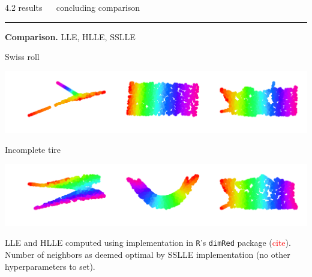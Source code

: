 \documentclass[11pt, compress, t, notes = noshow, xcolor = table, 
aspectratio = 1610]{beamer}
\begin{document}
\LARGE
\begin{frame}{\textcolor{gray!90}{4.2 results} ~~ concluding comparison}
\normalsize
\vspace{-0.5cm}
\noindent \textcolor{gray!90}{\rule{\textwidth}{1pt}}
\smallskip

\textbf{Comparison.} LLE, HLLE, SSLLE

\vspace{0.3cm}

\begin{minipage}[c]{0.2\textwidth}
  Swiss roll
\end{minipage}%
\begin{minipage}[c]{0.8\textwidth}
  \includegraphics[trim = 0 0 0 0, clip, %
    width = \textwidth]{figures/comparison_swiss}
\end{minipage}

\vspace{0.3cm}   

\begin{minipage}[c]{0.2\textwidth}
  Incomplete tire
\end{minipage}%
\begin{minipage}[c]{0.8\textwidth}
  \includegraphics[trim = 0 0 0 0, clip, %
    width = \textwidth]{figures/comparison_tire}
\end{minipage}


\vspace{0.3cm}  

\scriptsize
LLE and HLLE computed using implementation in \texttt{R}'s \texttt{dimRed} 
package (\textcolor{red}{cite}). \\
Number of neighbors as deemed optimal by SSLLE implementation (no other 
hyperparameters to set).

\end{frame}
\end{document}
